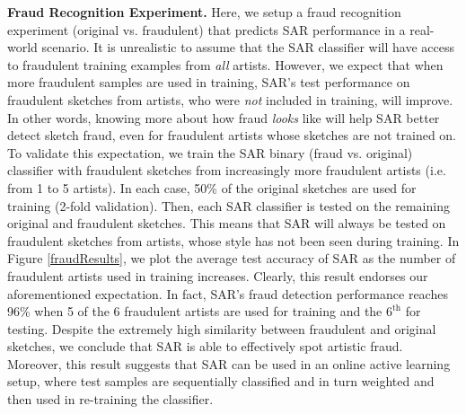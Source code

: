 \noindent\textbf{Fraud Recognition Experiment.} Here, we setup a fraud recognition experiment (original vs. fraudulent) that predicts SAR performance in a real-world scenario. It is unrealistic to assume that the SAR classifier will have access to fraudulent training examples from \emph{all} artists. However, we expect that when more fraudulent samples are used in training, SAR's test performance on fraudulent sketches from artists, who were \emph{not} included in training, will improve. In other words, knowing more about how fraud \emph{looks} like will help SAR better detect sketch fraud, even for fraudulent artists whose sketches are not trained on. To validate this expectation, we train the SAR binary (fraud vs. original) classifier with fraudulent sketches from increasingly more fraudulent artists (i.e. from 1 to 5 artists). In each case, 50\% of the original sketches are used for training (2-fold validation). Then, each SAR classifier is tested on the remaining original and fraudulent sketches. This means that SAR will always be tested on fraudulent sketches from artists, whose style has not been seen during training. In Figure \ref{fraudResults}, we plot the average test accuracy of SAR as the number of fraudulent artists used in training increases. Clearly, this result endorses our aforementioned expectation. In fact, SAR's fraud detection performance reaches 96\% when 5 of the 6 fraudulent artists are used for training and the $6^{\text{th}}$ for testing. Despite the extremely high similarity between fraudulent and original sketches, we conclude that SAR is able to effectively spot artistic fraud. Moreover, this result suggests that SAR can be used in an online active learning setup, where test samples are sequentially classified and in turn weighted and then used in re-training the classifier. %




